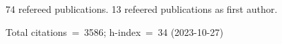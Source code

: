 74 refereed publications. 13 refeered publications as first author.

Total citations~=~3586; h-index~=~34 (2023-10-27)